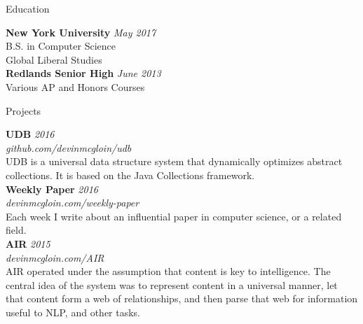 \documentclass{resume} %
\begin{document}

\begin{rSection}{Education}

{\bf New York University} \hfill {\em May 2017} \\ 
B.S. in Computer Science \\
Global Liberal Studies \\

{\bf Redlands Senior High} \hfill {\em June 2013} \\ 
Various AP and Honors Courses \\

\end{rSection}


\begin{rSection}{Projects}

{\bf UDB} \hfill {\em 2016} \\ 
{\em github.com/devinmcgloin/udb}\\
UDB is a universal data structure system that dynamically optimizes abstract collections. It is based on the Java Collections framework. \\

{\bf Weekly Paper} \hfill {\em 2016}\\
{\em devinmcgloin.com/weekly-paper}\\
Each week I write about an influential paper in computer science, or a related field. \\ 

{\bf AIR} \hfill {\em 2015} \\ 
{\em devinmcgloin.com/AIR}\\
AIR operated under the assumption that content is key to intelligence. The central idea of the system was to represent content in a universal manner, let that content form a web of relationships, and then parse that web for information useful to NLP, and other tasks. \\

\end{rSection}

\end{document}
